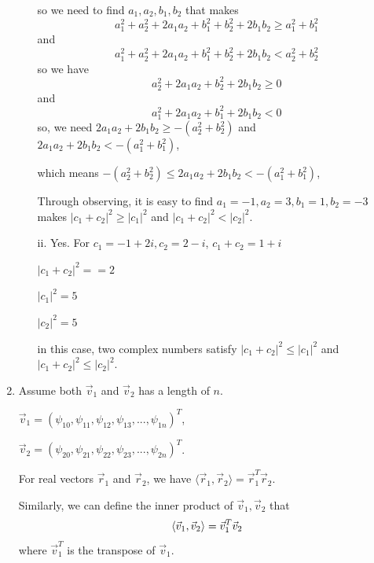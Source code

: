 \documentclass{article}
\begin{document}
\begin{enumerate}
\begin{enumerate}
                    so we need to find $a_1,a_2,b_1,b_2$ that makes
                    \[a_1^2+a_2^2+2a_1a_2+b_1^2+b_2^2+2b_1b_2\geq a_1^2+b_1^2\]
                    and
                    \[a_1^2+a_2^2+2a_1a_2+b_1^2+b_2^2+2b_1b_2<a_2^2+b_2^2\]
                    so we have
                    \[a_2^2+2a_1a_2+b_2^2+2b_1b_2\geq 0\]
                    and
                    \[a_1^2+2a_1a_2+b_1^2+2b_1b_2<0\]
                    so, we need $2a_1a_2+2b_1b_2\geq-(a_2^2+b_2^2)$ and $2a_1a_2+2b_1b_2<-(a_1^2+b_1^2)$,

                    which means $-(a_2^2+b_2^2)\leq 2a_1a_2+2b_1b_2<-(a_1^2+b_1^2)$,

                    Through observing, it is easy to find $a_1=-1,a_2=3,b_1=1,b_2=-3$ makes $|c_1+c_2|^2\geq |c_1|^2$ and $|c_1+c_2|^2< |c_2|^2$.

              \item[ii.]
                    Yes. For $c_1=-1+2i,c_2=2-i$, $c_1+c_2=1+i$

                    $|c_1+c_2|^2==2$

                    $|c_1|^2=5$

                    $|c_2|^2=5$

                    in this case, two complex numbers satisfy $|c_1 + c_2|^2\leq|c_1|^2$ and $|c_1 + c_2|^2\leq|c_2|^2$.

          \end{enumerate}
    \item Assume both $\vec{v}_1$ and $\vec{v}_2$ has a length of $n$.

          $\vec{v}_1=(\psi_{10},\psi_{11},\psi_{12},\psi_{13},...,\psi_{1n})^T$,

          $\vec{v}_2=(\psi_{20},\psi_{21},\psi_{22},\psi_{23},...,\psi_{2n})^T$.

          For real vectors $\vec{r}_1$ and $\vec{r}_2$, we have $\langle \vec{r}_1,\vec{r}_2 \rangle=\vec{r}_1^T\vec{r}_2$.

          Similarly, we can define the inner product of $\vec{v}_1,\vec{v}_2$ that
          \[\langle \vec{v}_1,\vec{v}_2 \rangle
              \\=\vec{v}_1^T\vec{v}_2
          \]
          where $\vec{v}_1^T$ is the transpose of $\vec{v}_1$.


\end{enumerate}
\end{document}

